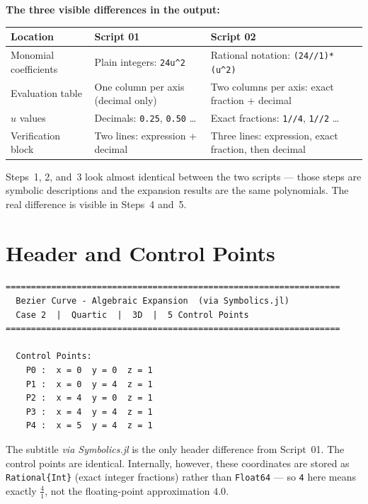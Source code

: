 \documentclass[12pt, a4paper]{article}
\newcommand{\cd}[1]{\texttt{#1}}
\begin{document}
\begin{diffbox}
\textbf{The three visible differences in the output:}

\medskip
\begin{tabular}{lp{4.5cm}p{4.5cm}}
\toprule
Location & Script 01 & Script 02 \\
\midrule
Monomial coefficients &
  Plain integers: \cd{24u\^{}2} &
  Rational notation: \cd{(24//1)*(u\^{}2)} \\[6pt]
Evaluation table &
  One column per axis (decimal only) &
  Two columns per axis: exact fraction + decimal \\[6pt]
$u$ values &
  Decimals: \cd{0.25}, \cd{0.50} \ldots &
  Exact fractions: \cd{1//4}, \cd{1//2} \ldots \\[6pt]
Verification block &
  Two lines: expression + decimal &
  Three lines: expression, exact fraction, then decimal \\
\bottomrule
\end{tabular}

\medskip
Steps~1, 2, and~3 look almost identical between the two scripts ---
those steps are symbolic descriptions and the expansion results
are the same polynomials.
The real difference is visible in Steps~4 and~5.
\end{diffbox}


\section{Header and Control Points}

\begin{verbatim}
==================================================================
  Bezier Curve - Algebraic Expansion  (via Symbolics.jl)
  Case 2  |  Quartic  |  3D  |  5 Control Points
==================================================================

  Control Points:
    P0 :  x = 0  y = 0  z = 1
    P1 :  x = 0  y = 4  z = 1
    P2 :  x = 4  y = 0  z = 1
    P3 :  x = 4  y = 4  z = 1
    P4 :  x = 5  y = 4  z = 1
\end{verbatim}

The subtitle \textit{via Symbolics.jl} is the only header difference
from Script~01.
The control points are identical.
Internally, however, these coordinates are stored as
\cd{Rational\{Int\}} (exact integer fractions) rather than
\cd{Float64} --- so \cd{4} here means exactly $\frac{4}{1}$,
not the floating-point approximation $4.0$.
\end{document}
